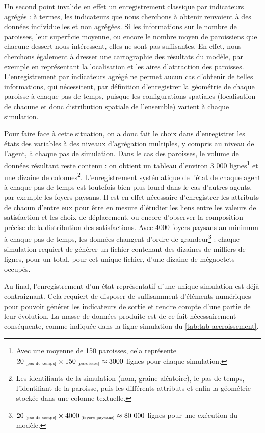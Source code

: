 Un second point invalide en effet un enregistrement classique par indicateurs agrégés :
	à termes, les indicateurs que nous cherchons à obtenir renvoient à des données individuelles et non agrégées.
Si les informations sur le nombre de paroisses, leur superficie moyenne, ou encore le nombre moyen de paroissiens que chacune dessert nous intéressent, elles ne sont pas suffisantes.
En effet, nous cherchons également à dresser une cartographie des résultats du modèle, par exemple en représentant la localisation et les aires d'attraction des paroisses.
L'enregistrement par indicateurs agrégé ne permet aucun cas d'obtenir de telles informations, qui nécessitent, par définition d'enregistrer la géométrie de chaque paroisse à chaque pas de temps, puisque les configurations spatiales (localisation de chacune et donc distribution spatiale de l'ensemble) varient à chaque simulation.

Pour faire face à cette situation, on a donc fait le choix dans \simfeodal{} d'enregistrer les états des variables à des niveaux d'agrégation multiples, y compris au niveau de l'agent, à chaque pas de simulation.
Dans le cas des paroisses, le volume de données résultant reste contenu : on obtient un tableau d'environ 3 000 lignes\footnote{
	Avec une moyenne de 150 paroisses, cela représente $20_{\text{\tiny ~[pas de temps]}} \times 150_{\text{\tiny ~[paroisses]}} \approx 3000$ lignes pour chaque simulation.
} et une dizaine de colonnes\footnote{
	Les identifiants de la simulation (nom, graine aléatoire), le pas de temps, l'identifiant de la paroisse, puis les différents attributs et enfin la géométrie stockée dans une colonne textuelle.
}.
L'enregistrement systématique de l'état de chaque agent à chaque pas de temps est toutefois bien plus lourd dans le cas d'autres agents, par exemple les foyers paysans.
Il est en effet nécessaire d'enregistrer les attributs de chacun d'entre eux pour être en mesure d'étudier les liens entre les valeurs de satisfaction et les choix de déplacement, ou encore d'observer la composition précise de la distribution des satisfactions. 
Avec $4000$ foyers paysans au minimum à chaque pas de temps, les données changent d'ordre de grandeur\footnote{
	$20_{\text{\tiny ~[pas de temps]}} \times 4000_{\text{\tiny ~[foyers paysans]}} \approx 80~000$ lignes pour une exécution du modèle.
} : chaque simulation requiert de générer un fichier contenant des dizaines de milliers de lignes, pour un total, pour cet unique fichier, d'une dizaine de mégaoctets occupés.

Au final, l'enregistrement d'un état représentatif d'une unique simulation est déjà contraignant.
Cela requiert de disposer de suffisamment d'éléments numériques pour pouvoir générer les indicateurs de sortie et rendre compte d'une partie de leur évolution.
La masse de données produite est de ce fait nécessairement conséquente, comme indiquée dans la ligne \og simulation\fg{} du \cref{tab:tab-accroissement}.

